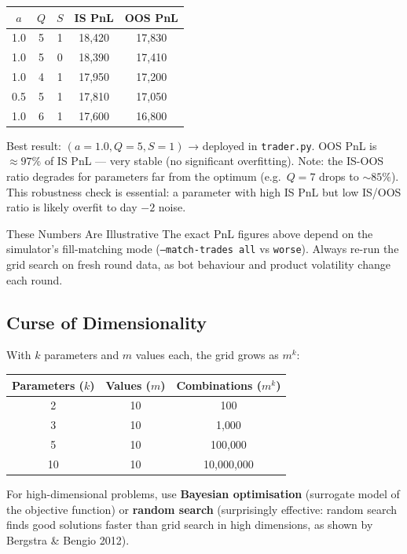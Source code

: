 \documentclass[12pt,a4paper,openany]{report}
\theoremstyle{definition}
\begin{document}
\begin{center}
\begin{tabular}{ccc|cc}
\toprule
$a$ & $Q$ & $S$ & IS PnL & OOS PnL \\
\midrule
1.0 & 5 & 1 & 18{,}420 & 17{,}830 \\
1.0 & 5 & 0 & 18{,}390 & 17{,}410 \\
1.0 & 4 & 1 & 17{,}950 & 17{,}200 \\
0.5 & 5 & 1 & 17{,}810 & 17{,}050 \\
1.0 & 6 & 1 & 17{,}600 & 16{,}800 \\
\bottomrule
\end{tabular}
\end{center}

Best result: $(a=1.0, Q=5, S=1)$ → deployed in \texttt{trader.py}. OOS PnL is $\approx 97\%$ of IS PnL — very stable (no significant overfitting). Note: the IS-OOS ratio degrades for parameters far from the optimum (e.g.\ $Q=7$ drops to $\sim 85\%$). This robustness check is essential: a parameter with high IS PnL but low IS/OOS ratio is likely overfit to day $-2$ noise.

\begin{warningbox}{These Numbers Are Illustrative}
The exact PnL figures above depend on the simulator's fill-matching mode (\texttt{--match-trades all} vs \texttt{worse}). Always re-run the grid search on fresh round data, as bot behaviour and product volatility change each round.
\end{warningbox}

\subsection{Curse of Dimensionality}

With $k$ parameters and $m$ values each, the grid grows as $m^k$:
\begin{center}
\begin{tabular}{ccc}
\toprule
Parameters ($k$) & Values ($m$) & Combinations ($m^k$) \\
\midrule
2 & 10 & 100 \\
3 & 10 & 1{,}000 \\
5 & 10 & 100{,}000 \\
10 & 10 & 10{,}000{,}000 \\
\bottomrule
\end{tabular}
\end{center}
For high-dimensional problems, use \textbf{Bayesian optimisation} (surrogate model of the objective function) or \textbf{random search} (surprisingly effective: random search finds good solutions faster than grid search in high dimensions, as shown by Bergstra \& Bengio 2012).
\end{document}
